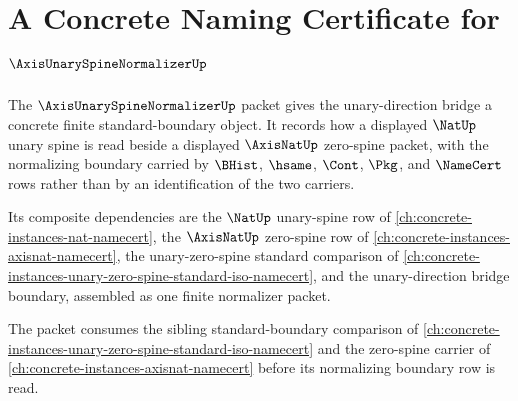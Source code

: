 \chapter{A Concrete Naming Certificate for $\AxisUnarySpineNormalizerUp$}
\label{ch:concrete-instances-axisunaryspinenormalizer-namecert}

The $\AxisUnarySpineNormalizerUp$ packet gives the unary-direction bridge a concrete finite standard-boundary object. It records how a displayed $\NatUp$ unary spine is read beside a displayed $\AxisNatUp$ zero-spine packet, with the normalizing boundary carried by $\BHist$, $\hsame$, $\Cont$, $\Pkg$, and $\NameCert$ rows rather than by an identification of the two carriers.

Its composite dependencies are the $\NatUp$ unary-spine row of \autoref{ch:concrete-instances-nat-namecert}, the $\AxisNatUp$ zero-spine row of \autoref{ch:concrete-instances-axisnat-namecert}, the unary-zero-spine standard comparison of \autoref{ch:concrete-instances-unary-zero-spine-standard-iso-namecert}, and the unary-direction bridge boundary, assembled as one finite normalizer packet.

The packet consumes the sibling standard-boundary comparison of \autoref{ch:concrete-instances-unary-zero-spine-standard-iso-namecert} and the zero-spine carrier of \autoref{ch:concrete-instances-axisnat-namecert} before its normalizing boundary row is read.

